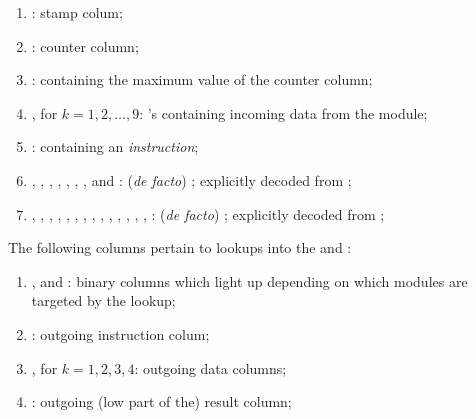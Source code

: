\begin{enumerate}
	\item \oobStamp{}:
		stamp colum;
	\item \ct{}:
		counter column;
	\item \maxCt{}:
		\ccc{} containing the maximum value of the counter column;
	\item {}, for $k = 1, 2, \dots, 9$: \godGiven{}
		\ccc{}'s containing incoming data from the \hubMod{} module;
	\item \oobInstruction{}: \godGiven{}
		\ccc{} containing an \emph{\oobMod{} instruction};
	\item
		\oobInstIsJump{},
		\oobInstIsJumpI{},
		\oobInstIsRdc{},
		\oobInstIsCdl{},
		\oobInstIsXcall{},
		\oobInstIsCall{},
		\oobInstIsCreate{},
		\oobInstIsSstore{} and 
		\oobInstIsDeployment{}:
		(\emph{de facto}) \ccbc{}; explicitly decoded from \oobInst{};
	\item 
		\oobInstIsEcrecover{},
		\oobInstIsShaTwo{},
		\oobInstIsRipemd{},
		\oobInstIsIdentity{},
		\oobInstIsEcadd{},
		\oobInstIsEcmul{},
		\oobInstIsEcpairing{},
		\oobInstIsPointEvaluation{},
		\oobInstIsBlakeCds{},
		\oobInstIsBlakeParams{},
		\oobInstIsModexpCds{},
		\oobInstIsModexpXbs{},
		\oobInstIsModexpLead{},
		\oobInstIsModexpPricing{},
		\oobInstIsModexpExtract{}:
		(\emph{de facto}) \ccbc{}; explicitly decoded from \oobInstruction{};
\end{enumerate}
The following columns pertain to lookups into the \wcpMod{} and \addMod{}: 
\begin{enumerate}[resume]
	\item \wcpFlag{}, \addFlag{} and \modFlag{}:
		binary columns which light up depending on which modules are targeted by the lookup;
	\item \outgoingInst{}:
		outgoing instruction colum;
	\item {}, for $k = 1, 2, 3, 4$:
		outgoing data columns;
	\item \outgoingResLo{}:
		outgoing (low part of the) result column;
\end{enumerate}
